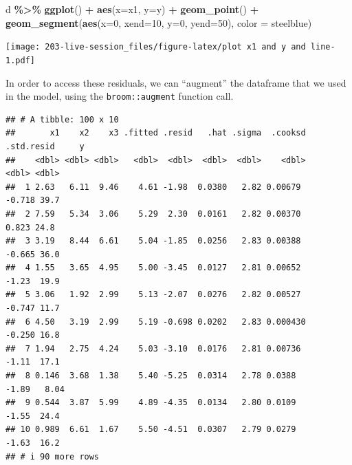 \documentclass[
]{book}
\newenvironment{Shaded}{\begin{snugshade}}{\end{snugshade}}
\newcommand{\AttributeTok}[1]{\textcolor[rgb]{0.13,0.29,0.53}{#1}}
\newcommand{\DecValTok}[1]{\textcolor[rgb]{0.00,0.00,0.81}{#1}}
\newcommand{\FunctionTok}[1]{\textcolor[rgb]{0.13,0.29,0.53}{\textbf{#1}}}
\newcommand{\NormalTok}[1]{#1}
\newcommand{\OtherTok}[1]{\textcolor[rgb]{0.56,0.35,0.01}{#1}}
\newcommand{\SpecialCharTok}[1]{\textcolor[rgb]{0.81,0.36,0.00}{\textbf{#1}}}
\newcommand{\StringTok}[1]{\textcolor[rgb]{0.31,0.60,0.02}{#1}}
\theoremstyle{definition}
\theoremstyle{definition}
\theoremstyle{definition}
\theoremstyle{definition}
\theoremstyle{remark}
\begin{document}
\begin{Shaded}
\begin{Highlighting}[]
\NormalTok{d }\SpecialCharTok{\%\textgreater{}\%} 
  \FunctionTok{ggplot}\NormalTok{() }\SpecialCharTok{+} 
  \FunctionTok{aes}\NormalTok{(}\AttributeTok{x=}\NormalTok{x1, }\AttributeTok{y=}\NormalTok{y) }\SpecialCharTok{+} 
  \FunctionTok{geom\_point}\NormalTok{() }\SpecialCharTok{+} 
  \FunctionTok{geom\_segment}\NormalTok{(}\FunctionTok{aes}\NormalTok{(}\AttributeTok{x=}\DecValTok{0}\NormalTok{, }\AttributeTok{xend=}\DecValTok{10}\NormalTok{, }\AttributeTok{y=}\DecValTok{0}\NormalTok{, }\AttributeTok{yend=}\DecValTok{50}\NormalTok{), }\AttributeTok{color =} \StringTok{\textquotesingle{}steelblue\textquotesingle{}}\NormalTok{)}
\end{Highlighting}
\end{Shaded}

\texttt{[image: 203-live-session\_files/figure-latex/plot x1 and y and line-1.pdf]}

In order to access these residuals, we can ``augment'' the dataframe that we used in the model, using the \texttt{broom::augment} function call.

\begin{Shaded}
\end{Shaded}

\begin{verbatim}
## # A tibble: 100 x 10
##       x1    x2    x3 .fitted .resid   .hat .sigma  .cooksd .std.resid     y
##    <dbl> <dbl> <dbl>   <dbl>  <dbl>  <dbl>  <dbl>    <dbl>      <dbl> <dbl>
##  1 2.63   6.11  9.46    4.61 -1.98  0.0380   2.82 0.00679      -0.718 39.7 
##  2 7.59   5.34  3.06    5.29  2.30  0.0161   2.82 0.00370       0.823 24.8 
##  3 3.19   8.44  6.61    5.04 -1.85  0.0256   2.83 0.00388      -0.665 36.0 
##  4 1.55   3.65  4.95    5.00 -3.45  0.0127   2.81 0.00652      -1.23  19.9 
##  5 3.06   1.92  2.99    5.13 -2.07  0.0276   2.82 0.00527      -0.747 11.7 
##  6 4.50   3.19  2.99    5.19 -0.698 0.0202   2.83 0.000430     -0.250 16.8 
##  7 1.94   2.75  4.24    5.03 -3.10  0.0176   2.81 0.00736      -1.11  17.1 
##  8 0.146  3.68  1.38    5.40 -5.25  0.0314   2.78 0.0388       -1.89   8.04
##  9 0.544  3.87  5.99    4.89 -4.35  0.0134   2.80 0.0109       -1.55  24.4 
## 10 0.989  6.61  1.67    5.50 -4.51  0.0307   2.79 0.0279       -1.63  16.2 
## # i 90 more rows
\end{verbatim}
\end{document}
